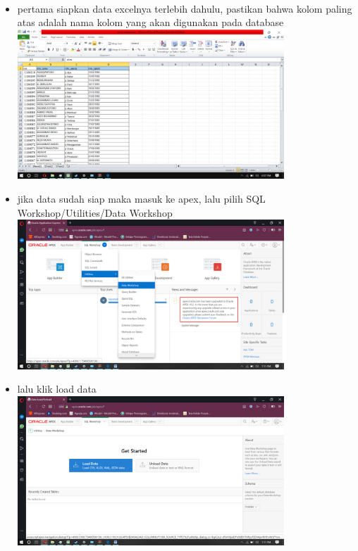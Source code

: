 \documentclass[a4paper,12pt]{report}
\begin{document}
\paragraph{}
\begin{itemize}
	\item pertama siapkan data excelnya terlebih dahulu, pastikan bahwa kolom paling atas adalah nama kolom yang akan digunakan pada database\\
	\includegraphics[width=10cm]{excel to db tabel/Screenshot (137).png}\\ 
	\item jika data sudah siap maka masuk ke apex, lalu pilih SQL Workshop/Utilities/Data Workshop\\
	\includegraphics[width=10cm]{excel to db tabel/Screenshot (139).png}\\ 
	\item lalu klik load data\\
	\includegraphics[width=10cm]{excel to db tabel/Screenshot (140).png}\\ 

\end{itemize}
\end{document}
